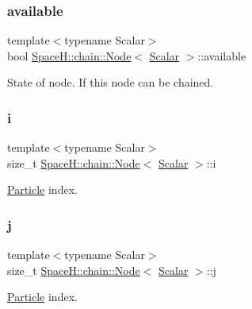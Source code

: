 \subsubsection{\texorpdfstring{available}{available}}
{\footnotesize\ttfamily template$<$typename Scalar$>$ \\
bool \mbox{\hyperlink{struct_space_h_1_1chain_1_1_node}{Space\+H\+::chain\+::\+Node}}$<$ \mbox{\hyperlink{create_kepler_8cpp_a8c2981f3f834be9448a6ab06c28748eb}{Scalar}} $>$\+::available}

State of node. If this node can be chained. \mbox{\label{struct_space_h_1_1chain_1_1_node_ac3784f544e43740ba9496a821b1818eb}} 
\subsubsection{\texorpdfstring{i}{i}}
{\footnotesize\ttfamily template$<$typename Scalar$>$ \\
size\+\_\+t \mbox{\hyperlink{struct_space_h_1_1chain_1_1_node}{Space\+H\+::chain\+::\+Node}}$<$ \mbox{\hyperlink{create_kepler_8cpp_a8c2981f3f834be9448a6ab06c28748eb}{Scalar}} $>$\+::i}

\mbox{\hyperlink{struct_space_h_1_1_particle}{Particle}} index. \mbox{\label{struct_space_h_1_1chain_1_1_node_a7e0bcb5270769de3d49ee981241b027c}} 
\subsubsection{\texorpdfstring{j}{j}}
{\footnotesize\ttfamily template$<$typename Scalar$>$ \\
size\+\_\+t \mbox{\hyperlink{struct_space_h_1_1chain_1_1_node}{Space\+H\+::chain\+::\+Node}}$<$ \mbox{\hyperlink{create_kepler_8cpp_a8c2981f3f834be9448a6ab06c28748eb}{Scalar}} $>$\+::j}

\mbox{\hyperlink{struct_space_h_1_1_particle}{Particle}} index. \mbox{\label{struct_space_h_1_1chain_1_1_node_aea525d23b6c16acd3e2c186d36327f92}} 
